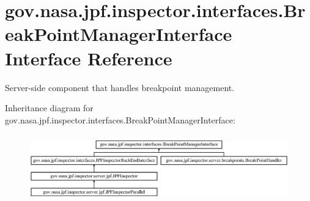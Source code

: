 \hypertarget{interfacegov_1_1nasa_1_1jpf_1_1inspector_1_1interfaces_1_1_break_point_manager_interface}{}\section{gov.\+nasa.\+jpf.\+inspector.\+interfaces.\+Break\+Point\+Manager\+Interface Interface Reference}
\label{interfacegov_1_1nasa_1_1jpf_1_1inspector_1_1interfaces_1_1_break_point_manager_interface}


Server-\/side component that handles breakpoint management.  


Inheritance diagram for gov.\+nasa.\+jpf.\+inspector.\+interfaces.\+Break\+Point\+Manager\+Interface\+:\begin{figure}[H]
\begin{center}
\leavevmode
\includegraphics[height=2.909091cm]{interfacegov_1_1nasa_1_1jpf_1_1inspector_1_1interfaces_1_1_break_point_manager_interface}
\end{center}
\end{figure}
